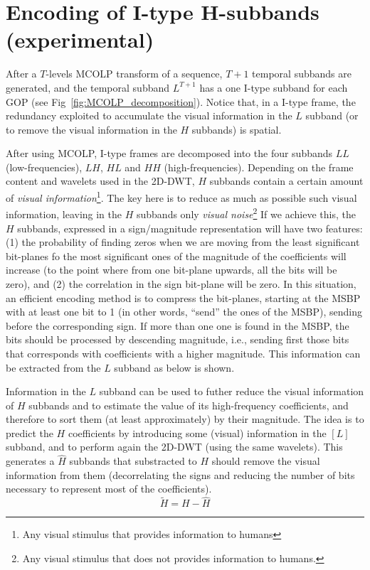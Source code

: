 
\section{Encoding of I-type H-subbands (experimental)}

After a $T$-levels MCOLP transform of a sequence, $T+1$ temporal
subbands are generated, and the temporal subband $L^{T+1}$ has a one
I-type subband for each GOP (see
Fig~\ref{fig:MCOLP_decomposition}). Notice that, in a I-type frame,
the redundancy exploited to accumulate the visual information in the
$L$ subband (or to remove the visual information in the $H$ subbands)
is spatial.

After using MCOLP, I-type frames are decomposed into
the four subbands $LL$ (low-frequencies), $LH$, $HL$ and $HH$
(high-frequencies). Depending on the frame content and wavelets used
in the 2D-DWT, $H$ subbands contain a certain amount of \emph{visual
  information}\footnote{Any visual stimulus that provides information
  to humans}. The key here is to reduce as much as possible such
visual information, leaving in the $H$ subbands only \emph{visual
  noise}\footnote{Any visual stimulus that does not provides
  information to humans.} If we achieve this, the $H$ subbands,
expressed in a sign/magnitude representation will have two features:
(1) the probability of finding zeros when we are moving from the least
significant bit-planes fo the most significant ones of the magnitude
of the coefficients will increase (to the point where from one
bit-plane upwards, all the bits will be zero), and (2) the correlation
in the sign bit-plane will be zero. In this situation, an efficient
encoding method is to compress the bit-planes, starting at the MSBP
with at least one bit to 1 (in other words, ``send'' the ones of the
MSBP), sending before the corresponding sign. If more than one one is
found in the MSBP, the bits should be processed by descending
magnitude, i.e., sending first those bits that corresponds with
coefficients with a higher magnitude. This information can be
extracted from the $L$ subband as below is shown.

Information in the $L$ subband can be used to futher reduce the visual
information of $H$ subbands and to estimate the value of its
high-frequency coefficients, and therefore to sort them (at least
approximately) by their magnitude. The idea is to predict the $H$
coefficients by introducing some (visual) information in the $[L]$
subband, and to perform again the 2D-DWT (using the same
wavelets). This generates a $\hat{H}$ subbands that substracted to $H$
should remove the visual information from them (decorrelating the
signs and reducing the number of bits necessary to represent most of
the coefficients).
\begin{equation}
  \tilde{H} = H - \hat{H}
\end{equation}

